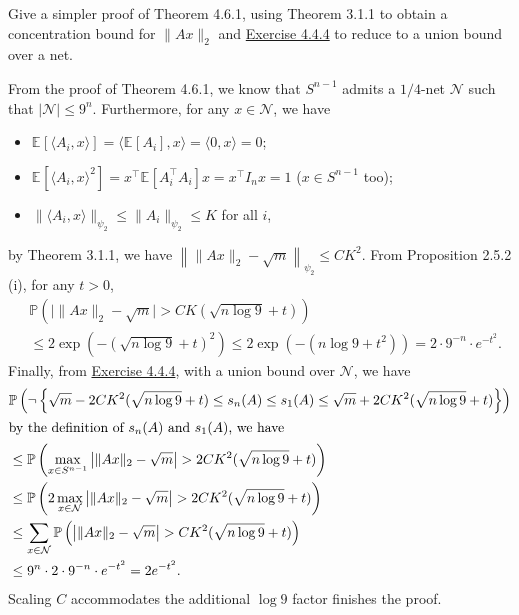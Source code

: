\begin{problem*}[Exercise 4.6.4]\label{ex4.6.4}
	Give a simpler proof of Theorem 4.6.1, using Theorem 3.1.1 to obtain a concentration bound for \(\lVert Ax \rVert _2\) and \hyperref[ex4.4.4]{Exercise 4.4.4} to reduce to a union bound over a net.
\end{problem*}
\begin{answer}
	From the proof of Theorem 4.6.1, we know that \(S^{n-1}\) admits a \(1 / 4\)-net \(\mathcal{N} \) such that \(\lvert \mathcal{N}  \rvert \leq 9^n\). Furthermore, for any \(x \in \mathcal{N} \), we have
	\begin{itemize}
		\item \(\mathbb{E}_{}[\langle A_i, x \rangle ] = \langle \mathbb{E}_{}[A_i] , x \rangle = \langle 0, x \rangle = 0\);
		\item \(\mathbb{E}_{}[\langle A_i, x \rangle ^2] = x^{\top} \mathbb{E}_{}[A_i ^{\top} A_i] x = x^{\top} I_n x = 1\) (\(x \in S^{n-1}\) too);
		\item \(\lVert \langle A_i, x \rangle  \rVert _{\psi _2} \leq \lVert A_i \rVert _{\psi _2} \leq K\) for all \(i\),
	\end{itemize}
	by Theorem 3.1.1, we have \(\left\lVert \lVert Ax \rVert _2 - \sqrt{m} \right\rVert _{\psi _2} \leq CK^2\). From Proposition 2.5.2 (i), for any \(t > 0\),
	\[
		\begin{split}
			 & \mathbb{P} \left( \lvert \lVert Ax \rVert _2 - \sqrt{m} \rvert > CK (\sqrt{n \log 9} + t) \right) \\
			 & \leq 2\exp (- (\sqrt{n \log 9} + t)^2)
			\leq 2 \exp (- (n \log 9 + t^2))
			= 2 \cdot 9^{-n} \cdot e^{-t^2}.
		\end{split}
	\]
	Finally, from \hyperref[ex4.4.4]{Exercise 4.4.4}, with a union bound over \(\mathcal{N} \), we have
	\begin{align*}
		 & \mathbb{P} \left( \lnot \left\{ \sqrt{m} - 2CK^2 (\sqrt{n \log 9} + t) \leq s_n(A) \leq s_1(A) \leq \sqrt{m} + 2CK^2(\sqrt{n \log 9} + t )\right\}  \right) \\
		\shortintertext{by the definition of \(s_n(A)\) and \(s_1(A)\), we have}
		 & \leq \mathbb{P} \left( \max _{x \in S^{n-1}} \left\lvert \lVert Ax \rVert _2 - \sqrt{m} \right\rvert > 2CK^2 (\sqrt{n \log 9} + t ) \right)                 \\
		 & \leq \mathbb{P} \left( 2 \max _{x \in \mathcal{N} } \left\lvert \lVert Ax \rVert _2 - \sqrt{m} \right\rvert > 2CK^2 (\sqrt{n \log 9} + t) \right)           \\
		 & \leq \sum_{x \in \mathcal{N} } \mathbb{P} \left( \left\lvert \lVert Ax \rVert _2 - \sqrt{m} \right\rvert > CK^2 ( \sqrt{n \log 9} + t) \right)              \\
		 & \leq 9^n \cdot 2 \cdot 9^{-n} \cdot e^{-t^2}
		= 2e^{-t^2}.
	\end{align*}
	Scaling \(C\) accommodates the additional \(\log 9\) factor finishes the proof.
\end{answer}

